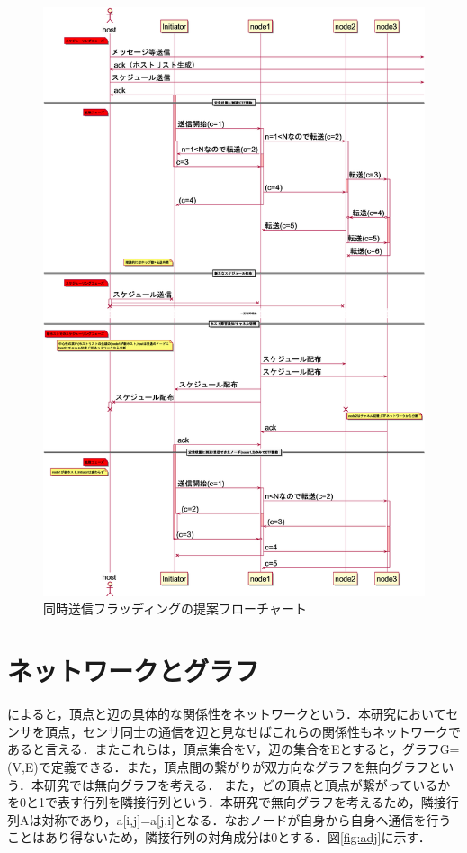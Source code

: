 \begin{figure}[H]
  \centering
  \includegraphics[width=1\textwidth]{figures/sequence_teian.eps}
  \caption{同時送信フラッディングの提案フローチャート}
  \label{fig:ctf_te}
\end{figure}

\section{ネットワークとグラフ}
\cite{network}によると，頂点と辺の具体的な関係性をネットワークという．本研究においてセンサを頂点，センサ同士の通信を辺と見なせばこれらの関係性もネットワークであると言える．またこれらは，頂点集合をV，辺の集合をEとすると，グラフG=(V,E)で定義できる．また，頂点間の繋がりが双方向なグラフを無向グラフという．本研究では無向グラフを考える．
また，どの頂点と頂点が繋がっているかを0と1で表す行列を隣接行列という．本研究で無向グラフを考えるため，隣接行列Aは対称であり，a[i,j]=a[j,i]となる．なおノードが自身から自身へ通信を行うことはあり得ないため，隣接行列の対角成分は0とする．図\ref{fig:adj}に示す．

